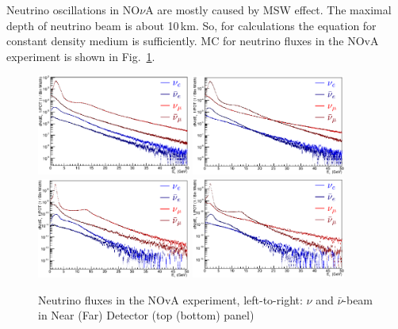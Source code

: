 Neutrino oscillations in NO$\nu$A are mostly caused by MSW effect. The maximal depth of neutrino beam is about 10\,km. So, for calculations the equation for constant density medium is sufficiently. MC for neutrino fluxes in the NOvA experiment is shown in Fig.~\ref{NOvAspectra}.

\begin{figure}[htb!]
\begin{center}
\includegraphics[width=0.45\textwidth]{./NOvA/ND_n.eps}
\includegraphics[width=0.45\textwidth]{./NOvA/ND_a.eps}
\includegraphics[width=0.45\textwidth]{./NOvA/FD_n.eps}
\includegraphics[width=0.45\textwidth]{./NOvA/FD_a.eps}
\caption{\label{NOvAspectra}Neutrino fluxes in the NOvA experiment, left-to-right: $\nu$ and $\bar\nu$-beam in Near (Far) Detector (top (bottom) panel)}
\end{center}
\end{figure}
